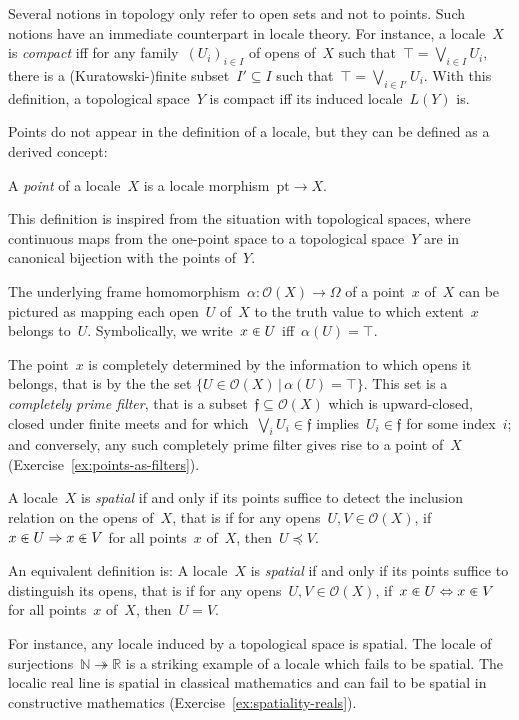 \documentclass{ws-rv9x6}
\renewcommand{\O}{\mathcal{O}}
\newcommand{\NN}{\mathbb{N}}
\newcommand{\RR}{\mathbb{R}}
\newcommand{\fff}{\mathfrak{f}}
\renewcommand{\_}{\mathpunct{.}}
\newcommand{\?}{\,{:}\,}
\newcommand{\pt}{\mathrm{pt}}
\begin{document}
Several notions in topology only refer to open sets and not to points. Such
notions have an immediate counterpart in locale theory. For instance, a
locale~$X$ is \emph{compact} iff for any family~$(U_i)_{i \in I}$ of opens
of~$X$ such that~$\top = \bigvee_{i \in I} U_i$, there is a (Kuratowski-)finite
subset~$I' \subseteq I$ such that~$\top = \bigvee_{i \in I'} U_i$.
With this definition, a topological space~$Y$ is compact iff its induced locale~$L(Y)$ is.

Points do not appear in the definition of a locale, but they can be defined as
a derived concept:
\begin{definition}A \emph{point} of a locale~$X$ is a locale morphism~$\pt \to
X$.\end{definition}

This definition is inspired from the situation with topological spaces, where
continuous maps from the one-point space to a topological space~$Y$ are in
canonical bijection with the points of~$Y$.

The underlying frame homomorphism~$\alpha : \O(X) \to \Omega$ of a point~$x$
of~$X$ can be pictured as mapping each open~$U$ of~$X$ to the truth value to which
extent~$x$ belongs to~$U$. Symbolically, we write~$x \inplus U$ iff~$\alpha(U)
= \top$.

The point~$x$ is completely determined by the information to which opens it
belongs, that is by the the set {$\{ U \in \O(X) \,|\, \alpha(U) = \top \}$}. This set is a \emph{completely
prime filter}, that is a subset~$\fff \subseteq \O(X)$ which is upward-closed,
closed under finite meets and for which~$\bigvee_i U_i \in \fff$ implies~$U_i
\in \fff$ for some index~$i$; and conversely, any such completely prime filter
gives rise to a point of~$X$ (Exercise~\ref{ex:points-as-filters}).

\begin{definition}A locale~$X$ is \emph{spatial} if and only if its points
suffice to detect the inclusion relation on the opens of~$X$, that is if for any opens~$U, V \in \O(X)$,
if~$x \inplus U \Rightarrow x \inplus V$ for all points~$x$ of~$X$, then~$U
\preceq V$.\end{definition}

An equivalent definition is: A locale~$X$ is \emph{spatial} if and only if its points
suffice to distinguish its opens, that is if for any opens~$U, V \in \O(X)$, if~$x \inplus U
\Leftrightarrow x \inplus V$ for all points~$x$ of~$X$, then~$U = V$.

For instance, any locale induced by a topological space is spatial. The locale
of surjections~$\NN \twoheadrightarrow \RR$ is a striking example of a locale which fails to be
spatial. The localic real line is spatial in classical mathematics and can
fail to be spatial in constructive mathematics (Exercise~\ref{ex:spatiality-reals}).
\end{document}
